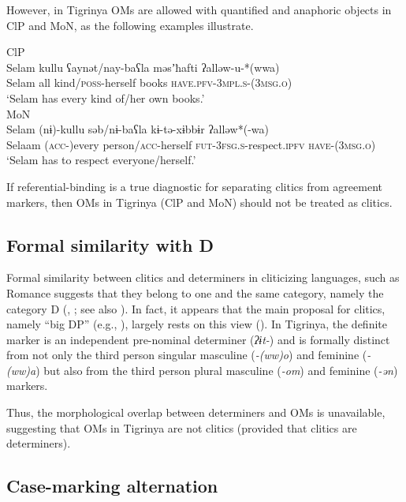 \documentclass[output=paper]{langscibook}
\begin{document}
\noindent However, in Tigrinya OMs are allowed with quantified and anaphoric objects in ClP and MoN, as the following examples illustrate.

\ea\label{ex:Gebregziabher:anaphor1} ClP \\
\gll Selam kullu ʕaynət/nay-baʕla məsʼħafti ʔalləw-u-*(wwa) \\ 
Selam all kind/{\scshape poss}-herself books {\scshape have.pfv-3mpl.s-(3msg.o})\\
\glt `Selam has every kind of/her own books.'\\
\vfill
\ex\label{ex:Gebregziabher:anaphor2} MoN \\
\gll Selam (nɨ)-kullu səb/nɨ-baʕla kɨ-tə-xɨbbɨr ʔalləw*(-wa)  \\ 
Selaam ({\scshape acc}-)every person/{\scshape acc}-herself {\scshape fut-3fsg.s}-respect.{\scshape ipfv} {\scshape have-(3msg.o})\\
\glt `Selam has to respect everyone/herself.'
\z


\noindent If referential-binding is a true diagnostic for separating clitics from agreement markers, then OMs in Tigrinya (ClP and MoN) should not be treated as clitics.


\subsection{Formal similarity with D}
Formal similarity between clitics and determiners in cliticizing languages, such as Romance suggests that they belong to one and the same category, namely the category D (\citealt{bleam99}, \citealt{uri95}; see also \citealt{preminger14}). In fact, it appears that the main proposal for clitics, namely ``big DP'' (e.g., \citealt{nevins11a}), largely rests on this view (\citealt{bleam99}). 
In Tigrinya, the definite marker is an independent pre-nominal determiner (\emph{ʔɨt-}) and is formally distinct from not only the third person singular masculine (\emph{-(ww)o}) and feminine (\emph{-(ww)a}) but also from the third person plural masculine (\emph{-om}) and feminine (\emph{-ən}) markers. 

Thus, the morphological overlap between determiners and OMs is unavailable, suggesting that OMs in Tigrinya are not clitics (provided that clitics are determiners). 


\subsection{Case-marking alternation}\label{ex:Gebregziabher:Case}
\end{document}
